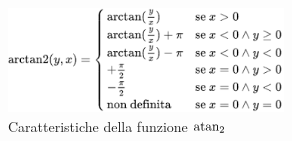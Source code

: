 \begin{figure}[h]
	\centering
	\includegraphics[width=0.65\textwidth]{Immagini/atan2}
	\caption{Caratteristiche della funzione $\operatorname{atan_2}$}
	\label{fig:atan2}
\end{figure}

